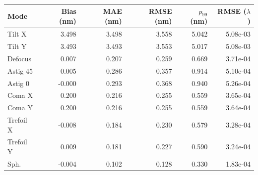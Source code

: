 \begin{tabular}{lrrrrr}
\hline
Mode & Bias (nm) & MAE (nm) & RMSE (nm) & $p_{99}$ (nm) & RMSE ($\lambda$) \\
\hline
Tilt X & 3.498 & 3.498 & 3.558 & 5.042 & 5.08e-03 \\
Tilt Y & 3.493 & 3.493 & 3.553 & 5.017 & 5.08e-03 \\
Defocus & 0.007 & 0.207 & 0.259 & 0.669 & 3.71e-04 \\
Astig 45 & 0.005 & 0.286 & 0.357 & 0.914 & 5.10e-04 \\
Astig 0 & -0.000 & 0.293 & 0.368 & 0.940 & 5.26e-04 \\
Coma X & 0.200 & 0.216 & 0.255 & 0.559 & 3.65e-04 \\
Coma Y & 0.200 & 0.216 & 0.255 & 0.559 & 3.64e-04 \\
Trefoil X & -0.008 & 0.184 & 0.230 & 0.579 & 3.28e-04 \\
Trefoil Y & 0.009 & 0.181 & 0.227 & 0.590 & 3.24e-04 \\
Sph. & -0.004 & 0.102 & 0.128 & 0.330 & 1.83e-04 \\
\hline
\end{tabular}
